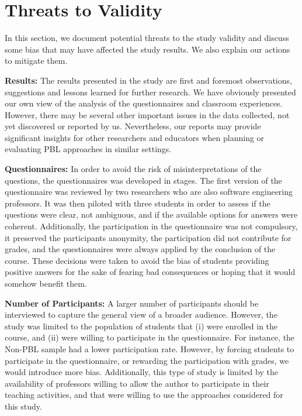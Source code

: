 \section{Threats to Validity}

In this section, we document potential threats to the study validity and discuss some bias that may have affected the study results. We also explain our actions to mitigate them.

\textbf{Results:} The results presented in the study are first and foremost observations, suggestions and lessons learned for further research. We have obviously presented our own view of the analysis of the questionnaires and classroom experiences. However, there may be several other important issues in the data collected, not yet discovered or reported by us. Nevertheless, our reports may provide significant insights for other researchers and educators when planning or evaluating PBL approaches in similar settings.
	
\textbf{Questionnaires:} In order to avoid the risk of misinterpretations of the questions, the questionnaires was developed in stages. The first version of the questionnaire was reviewed by two researchers who are also software engineering professors. It was then piloted with three students in order to assess if the questions were clear, not ambiguous, and if the available options for answers were coherent. Additionally, the participation in the questionnaire was not compulsory, it preserved the participants anonymity, the participation did not contribute for grades, and the questionnaires were always applied by the conclusion of the course. These decisions were taken to avoid the bias of students providing positive answers for the sake of fearing bad consequences or hoping that it would somehow benefit them.

\textbf{Number of Participants:} A larger number of participants should be interviewed to capture the general view of a broader audience. However, the study was limited to the population of students that (i) were enrolled in the course, and (ii) were willing to participate in the questionnaire. For instance, the Non-PBL sample had a lower participation rate. However, by forcing students to participate in the questionnaire, or rewarding the participation with grades, we would introduce more bias. Additionally, this type of study is limited by the availability of professors willing to allow the author to participate in their teaching activities, and that were willing to use the approaches considered for this study.

